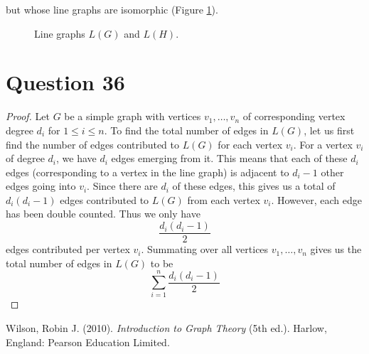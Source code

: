 \documentclass[11pt, oneside]{article}   	%
\begin{document}
but whose line graphs are isomorphic (Figure \ref{line graphs}).
\begin{figure}
        	\centering
       \caption{Line graphs $L(G)$ and $L(H)$.}		        
       \label{line graphs}
\end{figure}

\section*{Question 36}

\begin{proof}
Let $G$ be a simple graph with vertices $v_1, \ldots , v_n$ of corresponding vertex degree $d_i$ for $1 \leq i \leq n$. To find the total number of edges in $L(G)$, let us first find the number of edges contributed to $L(G)$ for each vertex $v_i$. For a vertex $v_i$ of degree $d_i$, we have $d_i$ edges emerging from it. This means that each of these $d_i$ edges (corresponding to a vertex in the line graph) is adjacent to $d_i - 1$ other edges going into $v_i$. Since there are $d_i$ of these edges, this gives us a total of $d_i(d_i-1)$ edges contributed to $L(G)$ from each vertex $v_i$. However, each edge has been double counted. Thus we only have
$$\frac{d_i(d_i-1)}{2}$$
edges contributed per vertex $v_i$. Summating over all vertices $v_1, \ldots, v_n$ gives us the total number of edges in $L(G)$ to be
$$\sum_{i=1}^n \frac{d_i(d_i-1)}{2}$$
\end{proof}



\cleardoublepage

\begin{thebibliography}{10}

 Wilson, Robin J. (2010). \textit{Introduction to Graph Theory} (5th ed.). Harlow, England: Pearson Education Limited.

\end{thebibliography}
\end{document}
